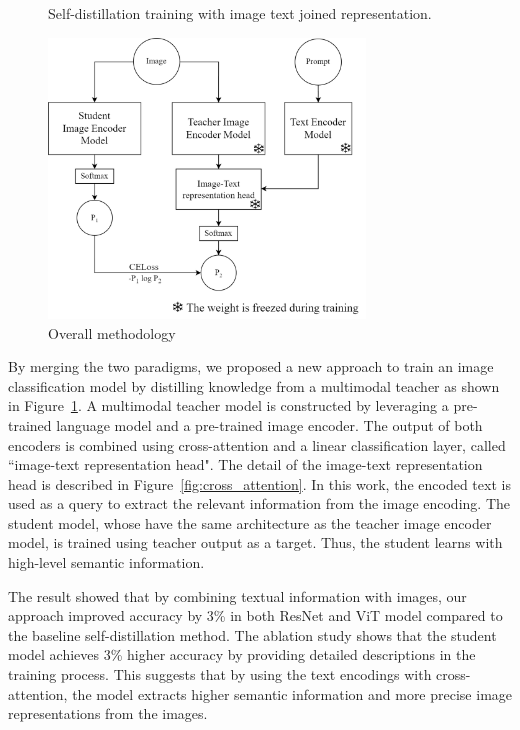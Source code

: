 \begin{figure}[h]
\caption{Overall methodology}
Self-distillation training with image text joined representation.
\label{fig:overall_method}
\begin{center}
\includegraphics[width=0.75\textwidth]{Images/OverviewMethod.png}
\end{center}
\small
\end{figure}

By merging the two paradigms, we proposed a new approach to train an image classification model by distilling knowledge from a multimodal teacher as shown in Figure~\ref{fig:overall_method}.
A multimodal teacher model is constructed by leveraging a pre-trained language model and a pre-trained image encoder.
The output of both encoders is combined using cross-attention and a linear classification layer, called ``image-text representation head".
The detail of the image-text representation head is described in Figure~\ref{fig:cross_attention}.
In this work, the encoded text is used as a query to extract the relevant information from the image encoding.
The student model, whose have the same architecture as the teacher image encoder model, is trained using teacher output as a target.
Thus, the student learns with high-level semantic information.

The result showed that by combining textual information with images, our approach improved accuracy by 3\% in both ResNet  and ViT  model compared to the baseline self-distillation method.
The ablation study shows that the student model achieves 3\% higher accuracy by providing detailed descriptions in the training process.
This suggests that by using the text encodings with cross-attention, the model extracts higher semantic information and more precise image representations from the images.

